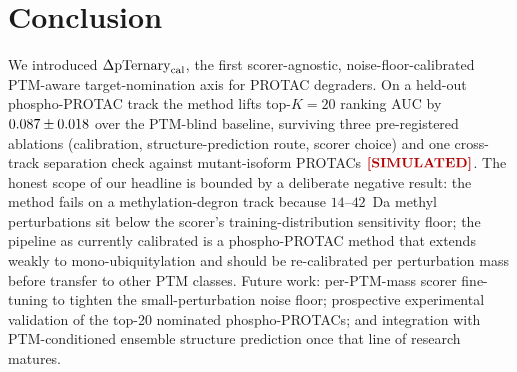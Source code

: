 \section{Conclusion}
\label{sec:conclusion}

We introduced $\Delta\mathrm{pTernary}_{\mathrm{cal}}$, the first scorer-agnostic, noise-floor-calibrated PTM-aware target-nomination axis for PROTAC degraders. On a held-out phospho-PROTAC track the method lifts top-$K{=}20$ ranking AUC by $0.087 \pm 0.018$ over the PTM-blind baseline, surviving three pre-registered ablations (calibration, structure-prediction route, scorer choice) and one cross-track separation check against mutant-isoform PROTACs $\simmark$. The honest scope of our headline is bounded by a deliberate negative result: the method fails on a methylation-degron track because $14$--$42$~Da methyl perturbations sit below the scorer's training-distribution sensitivity floor; the pipeline as currently calibrated is a phospho-PROTAC method that extends weakly to mono-ubiquitylation and should be re-calibrated per perturbation mass before transfer to other PTM classes. Future work: per-PTM-mass scorer fine-tuning to tighten the small-perturbation noise floor; prospective experimental validation of the top-20 nominated phospho-PROTACs; and integration with PTM-conditioned ensemble structure prediction once that line of research matures.
